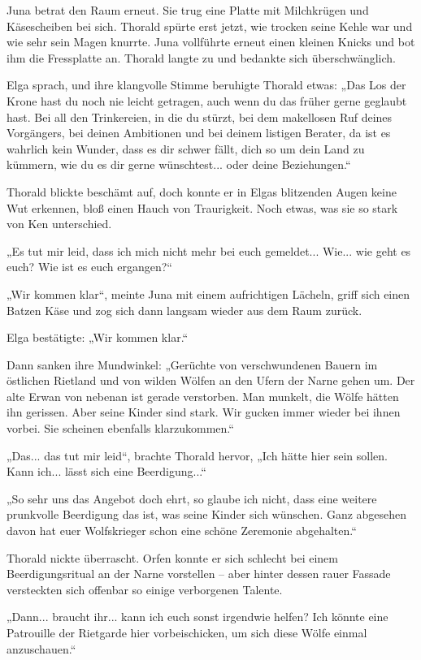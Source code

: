 \documentclass[10pt, a4paper, oneside]{book}
\begin{document}
Juna betrat den Raum erneut. Sie trug eine Platte mit Milchkrügen und Käsescheiben bei sich. Thorald spürte erst jetzt, wie trocken seine Kehle war und wie sehr sein Magen knurrte. Juna vollführte erneut einen kleinen Knicks und bot ihm die Fressplatte an. Thorald langte zu und bedankte sich überschwänglich.

Elga sprach, und ihre klangvolle Stimme beruhigte Thorald etwas: „Das Los der Krone hast du noch nie leicht getragen, auch wenn du das früher gerne geglaubt hast. Bei all den Trinkereien, in die du stürzt, bei dem makellosen Ruf deines Vorgängers, bei deinen Ambitionen und bei deinem listigen Berater, da ist es wahrlich kein Wunder, dass es dir schwer fällt, dich so um dein Land zu kümmern, wie du es dir gerne wünschtest... oder deine Beziehungen.“

Thorald blickte beschämt auf, doch konnte er in Elgas blitzenden Augen keine Wut erkennen, bloß einen Hauch von Traurigkeit. Noch etwas, was sie so stark von Ken unterschied.

„Es tut mir leid, dass ich mich nicht mehr bei euch gemeldet... Wie... wie geht es euch? Wie ist es euch ergangen?“

„Wir kommen klar“, meinte Juna mit einem aufrichtigen Lächeln, griff sich einen Batzen Käse und zog sich dann langsam wieder aus dem Raum zurück.

Elga bestätigte: „Wir kommen klar.“

Dann sanken ihre Mundwinkel: „Gerüchte von verschwundenen Bauern im östlichen Rietland und von wilden Wölfen an den Ufern der Narne gehen um. Der alte Erwan von nebenan ist gerade verstorben. Man munkelt, die Wölfe hätten ihn gerissen. Aber seine Kinder sind stark. Wir gucken immer wieder bei ihnen vorbei. Sie scheinen ebenfalls klarzukommen.“

„Das... das tut mir leid“, brachte Thorald hervor, „Ich hätte hier sein sollen. Kann ich... lässt sich eine Beerdigung...“

„So sehr uns das Angebot doch ehrt, so glaube ich nicht, dass eine weitere prunkvolle Beerdigung das ist, was seine Kinder sich wünschen. Ganz abgesehen davon hat euer Wolfskrieger schon eine schöne Zeremonie abgehalten.“

Thorald nickte überrascht. Orfen konnte er sich schlecht bei einem Beerdigungsritual an der Narne vorstellen – aber hinter dessen rauer Fassade versteckten sich offenbar so einige verborgenen Talente.

„Dann... braucht ihr... kann ich euch sonst irgendwie helfen? Ich könnte eine Patrouille der Rietgarde hier vorbeischicken, um sich diese Wölfe einmal anzuschauen.“
\end{document}
